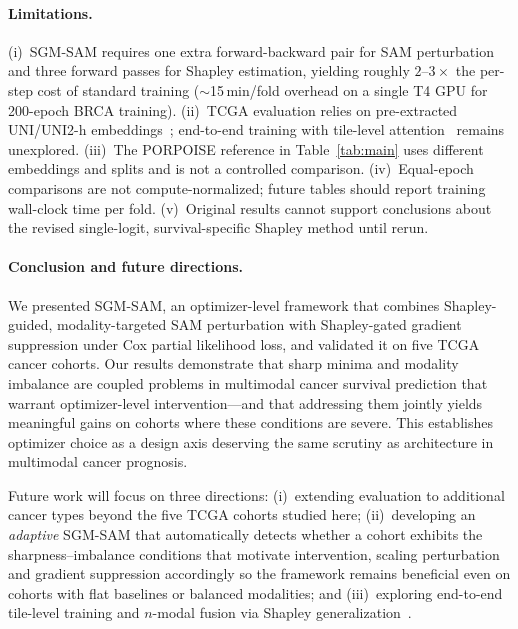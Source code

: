 \documentclass[runningheads]{llncs}
\begin{document}
\paragraph{Limitations.}
(i)~SGM-SAM requires one extra forward-backward pair for SAM
perturbation and three forward passes for Shapley estimation, yielding
roughly $2$--$3\times$ the per-step cost of standard training
($\sim$15\,min/fold overhead on a single T4 GPU for 200-epoch BRCA
training). (ii)~TCGA evaluation relies on pre-extracted UNI/UNI2-h
embeddings~\cite{vorontsov2024virchow, lu2024conch, chen2024uni};
end-to-end training with tile-level
attention~\cite{lu2021abmil} remains unexplored. (iii)~The PORPOISE reference in Table~\ref{tab:main} uses different
embeddings and splits and is not a controlled comparison.
(iv)~Equal-epoch comparisons are not compute-normalized;
future tables should report training wall-clock time per fold.
(v)~Original results cannot support conclusions about the revised
single-logit, survival-specific Shapley method until rerun.

\paragraph{Conclusion and future directions.}
We presented SGM-SAM, an optimizer-level framework that combines
Shapley-guided, modality-targeted SAM perturbation with Shapley-gated
gradient suppression under Cox partial likelihood loss, and validated
it on five TCGA cancer cohorts. Our results demonstrate that sharp
minima and modality imbalance are coupled problems in multimodal cancer
survival prediction that warrant optimizer-level intervention---and
that addressing them jointly yields meaningful gains on cohorts where
these conditions are severe. This establishes optimizer choice as a
design axis deserving the same scrutiny as architecture in multimodal
cancer prognosis.

Future work will focus on three directions: (i)~extending evaluation
to additional cancer types beyond the five TCGA cohorts studied here;
(ii)~developing an \textit{adaptive} SGM-SAM that automatically
detects whether a cohort exhibits the sharpness--imbalance conditions
that motivate intervention, scaling perturbation and gradient
suppression accordingly so the framework remains beneficial even on
cohorts with flat baselines or balanced modalities; and (iii)~exploring
end-to-end tile-level training and $n$-modal fusion via Shapley
generalization~\cite{shapley1953}.



\end{document}
